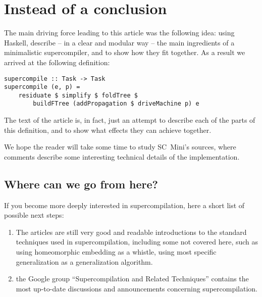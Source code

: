 \section{Instead of a conclusion}

The main driving force leading to this article was the following idea: 
using Haskell, describe -- in a clear and modular way --
the main ingredients of a minimalistic supercompiler, and to show how they fit together.
As a result we arrived at the following definition:
\begin{lstlisting}
supercompile :: Task -> Task
supercompile (e, p) =
	residuate $ simplify $ foldTree $
		buildFTree (addPropagation $ driveMachine p) e
\end{lstlisting}
The text of the article is, in fact, just an attempt to describe each
of the parts of this definition, and to show what effects they can
achieve together.

We hope the reader will take some time to study SC~Mini's sources,
where comments describe some interesting technical details of
the implementation.

\subsection{Where can we go from here?}

If you become more deeply interested in supercompilation, here a short
list of possible next steps:

\begin{enumerate}
  \item The articles \cite{Sorensen1998Introduction,Sorensen1996Positive} are 
  still very good and readable introductions to the standard techniques used in supercompilation,
  including some not covered here, such as using homeomorphic embedding as a whistle,
  using most specific generalization as a generalization algorithm.
  \item the Google group ``Supercompilation and Related Techniques'' contains the most 
  up-to-date discussions and announcements concerning supercompilation.
  \end{enumerate}

